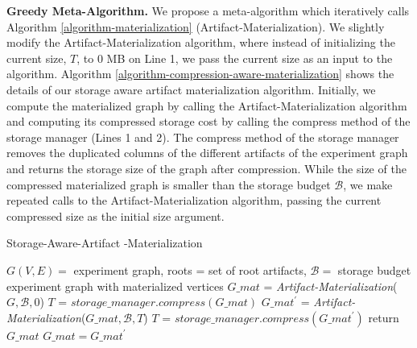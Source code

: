 \textbf{Greedy Meta-Algorithm.}
We propose a meta-algorithm which iteratively calls Algorithm \ref{algorithm-materialization} (Artifact-Materialization).
We slightly modify the Artifact-Materialization algorithm, where instead of initializing the current size, $T$, to 0 MB on Line 1, we pass the current size as an input to the algorithm. 
Algorithm \ref{algorithm-compression-aware-materialization} shows the details of our storage aware artifact materialization algorithm.
Initially, we compute the materialized graph by calling the Artifact-Materialization algorithm and computing its compressed storage cost by calling the compress method of the storage manager (Lines 1 and 2).
The compress method of the storage manager removes the duplicated columns of the different artifacts of the experiment graph and returns the storage size of the graph after compression.
While the size of the compressed materialized graph is smaller than the storage budget $\mathcal{B}$, we make repeated calls to the Artifact-Materialization algorithm, passing the current compressed size as the initial size argument.
\begin{algorithm}[h]
\caption{Storage-Aware-Artifact -Materialization}\label{algorithm-compression-aware-materialization}
\begin{algorithmic}[1]
\Require  $G(V,E)=$ experiment graph, roots = set of root artifacts, $\mathcal{B}=$ storage budget
\Ensure experiment graph with materialized vertices
\State $G\_mat$ = \textit{Artifact-Materialization}($G, \mathcal{B}, 0$)
\State $T$ = $storage\_manager.compress(G\_mat)$
	\State $G\_mat^\prime$  = \textit{Artifact-Materialization}($G\_mat, \mathcal{B}, T$)
	\State $T$ = $storage\_manager.compress(G\_mat^\prime)$
		\State return $G\_mat$
	\Else
		 \State $G\_mat = G\_mat^\prime$
	\EndIf
\EndWhile
\end{algorithmic}
\end{algorithm}

